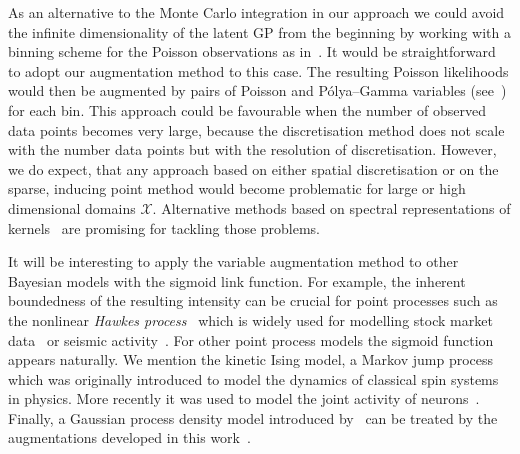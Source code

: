 \documentclass[twoside,11pt]{article}
\newcommand{\X}{\mathcal{X}}
\begin{document}
As an alternative to the Monte Carlo integration in our approach we could avoid the infinite dimensionality of the latent GP from the beginning by working with a binning scheme for the Poisson observations as in~\citet{hensman2015mcmc}.
It would be straightforward to adopt our augmentation method to this case. The resulting Poisson likelihoods would then be augmented by pairs of Poisson and P\'olya--Gamma variables (see~\citet{donner2017inverse}) for each bin. This approach could be favourable when the number of observed data points becomes very large, because the discretisation method does not scale with the number data points but with the resolution of discretisation. However, we do expect, that any approach based on either spatial discretisation or on the sparse, inducing point method would become problematic for large or high dimensional domains $\X$.  Alternative methods based on spectral representations of kernels~\citep{knollmuller2017inference,john2018large} are promising 
for tackling those problems.

It will be interesting to apply the variable augmentation method to other Bayesian models with the sigmoid link function. For example, the inherent boundedness of the resulting intensity can be crucial for point processes such as the nonlinear {\it Hawkes process}~\citep{hawkes1971spectra} which is widely used for modelling stock market data~\citep{embrechts2011multivariate} or seismic activity~\citep{ogata1998space}. For other point process models the sigmoid function appears naturally. We mention the kinetic Ising model, a Markov jump process~\citep{donner2017inverse} which was originally introduced to model the dynamics of classical spin systems in physics. More recently it was used to model the joint activity of neurons~\citep{dunn2015correlations}. Finally, a Gaussian process density model introduced by~\citep{murray2009gaussian} can be treated by the augmentations developed in this work~\citep{donner2018efficient}. 



\newpage

\appendix


\vskip 0.2in

\end{document}
